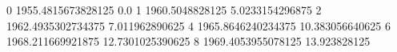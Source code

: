 0 1955.4815673828125 0.0
1 1960.5048828125 5.0233154296875
2 1962.4935302734375 7.011962890625
4 1965.8646240234375 10.383056640625
6 1968.211669921875 12.7301025390625
8 1969.4053955078125 13.923828125
